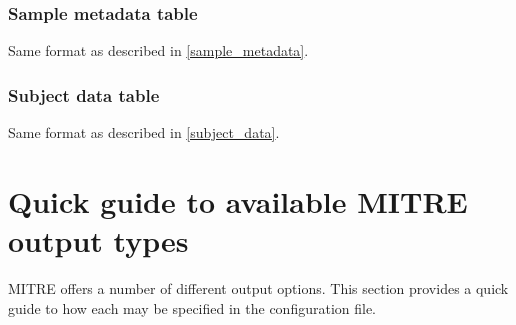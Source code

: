 \documentclass[12pt]{report}
\begin{document}
\subsection{Sample metadata table} Same format as described in \ref{sample_metadata}.

\subsection{Subject data table} Same format as described in \ref{subject_data}.

\chapter{Quick guide to available MITRE output types}
MITRE offers a number of different output options. This section
provides a quick guide to how each may be specified in the configuration
file.
\end{document}
